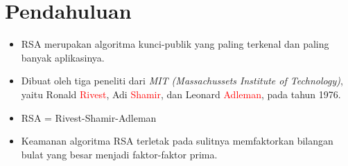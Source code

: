 \documentclass{article}
\begin{document}

\section*{Pendahuluan}

\begin{itemize}
    \item RSA merupakan algoritma kunci-publik yang paling terkenal dan paling banyak aplikasinya.
    \item Dibuat oleh tiga peneliti dari \textit{MIT (Massachussets Institute of Technology)}, yaitu Ronald \textcolor{red}{Rivest}, Adi \textcolor{red}{Shamir}, dan Leonard \textcolor{red}{Adleman}, pada tahun 1976.
    \item RSA = Rivest-Shamir-Adleman
    \item Keamanan algoritma RSA terletak pada sulitnya memfaktorkan bilangan bulat yang besar menjadi faktor-faktor prima.
\end{itemize}
\end{document}
